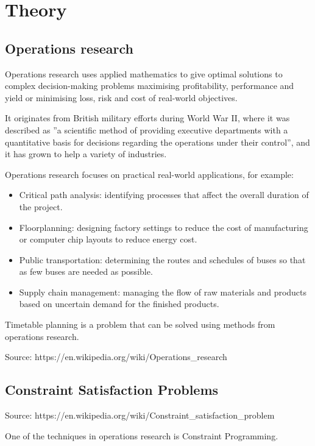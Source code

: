 \chapter{Theory}

\section{Operations research}

Operations research uses applied mathematics to give optimal solutions to complex decision-making problems maximising profitability, performance and yield or minimising loss, risk and cost of real-world objectives.

It originates from British military efforts during World War II, where it was described as ''a scientific method of providing executive departments with a quantitative basis for decisions regarding the operations under their control'', and it has grown to help a variety of industries. 

Operations research focuses on practical real-world applications, for example:

\begin{itemize}
\item Critical path analysis: identifying processes that affect the overall duration of the project.
\item Floorplanning: designing factory settings to reduce the cost of manufacturing or computer chip layouts to reduce energy cost.
\item Public transportation: determining the routes and schedules of buses so that as few buses are needed as possible.
\item Supply chain management: managing the flow of raw materials and products based on uncertain demand for the finished products.
\end{itemize}

Timetable planning is a problem that can be solved using methods from operations research.

Source: https://en.wikipedia.org/wiki/Operations\_research

\section{Constraint Satisfaction Problems}

Source: https://en.wikipedia.org/wiki/Constraint\_satisfaction\_problem

One of the techniques in operations research is Constraint Programming.

